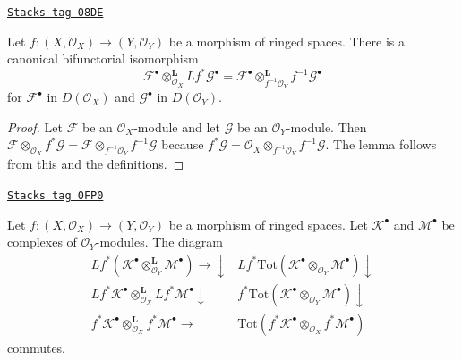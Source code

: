 \begin{lemma}
\label{cohomology-lemma-variant-derived-pullback}
\href{https://stacks.math.columbia.edu/tag/08DE}{\texttt{Stacks tag 08DE}}

Let $f : (X, \mathcal{O}_X) \to (Y, \mathcal{O}_Y)$
be a morphism of ringed spaces. There is a canonical bifunctorial
isomorphism
$$
\mathcal{F}^\bullet
\otimes_{\mathcal{O}_X}^{\mathbf{L}}
Lf^*\mathcal{G}^\bullet
=
\mathcal{F}^\bullet
\otimes_{f^{-1}\mathcal{O}_Y}^{\mathbf{L}}
f^{-1}\mathcal{G}^\bullet
$$
for $\mathcal{F}^\bullet$ in $D(\mathcal{O}_X)$ and
$\mathcal{G}^\bullet$ in $D(\mathcal{O}_Y)$.
\end{lemma}

\begin{proof}
Let $\mathcal{F}$ be an $\mathcal{O}_X$-module and let $\mathcal{G}$
be an $\mathcal{O}_Y$-module. Then
$\mathcal{F} \otimes_{\mathcal{O}_X} f^*\mathcal{G} =
\mathcal{F} \otimes_{f^{-1}\mathcal{O}_Y} f^{-1}\mathcal{G}$
because
$f^*\mathcal{G} =
\mathcal{O}_X \otimes_{f^{-1}\mathcal{O}_Y} f^{-1}\mathcal{G}$.
The lemma follows from this and the definitions.
\end{proof}

\begin{lemma}
\label{cohomology-lemma-tensor-pull-compatibility}
\href{https://stacks.math.columbia.edu/tag/0FP0}{\texttt{Stacks tag 0FP0}}

Let $f : (X, \mathcal{O}_X) \to (Y, \mathcal{O}_Y)$ be a morphism
of ringed spaces. Let $\mathcal{K}^\bullet$ and $\mathcal{M}^\bullet$
be complexes of $\mathcal{O}_Y$-modules. The diagram
$$
\begin{array}{cc}Lf^*(\mathcal{K}^\bullet
\otimes_{\mathcal{O}_Y}^\mathbf{L}
\mathcal{M}^\bullet) \longrightarrow\downarrow & Lf^*\text{Tot}(\mathcal{K}^\bullet
\otimes_{\mathcal{O}_Y}
\mathcal{M}^\bullet) \downarrow \\ Lf^*\mathcal{K}^\bullet \otimes_{\mathcal{O}_X}^\mathbf{L}
Lf^*\mathcal{M}^\bullet \downarrow & f^*\text{Tot}(\mathcal{K}^\bullet
\otimes_{\mathcal{O}_Y}
\mathcal{M}^\bullet) \downarrow \\ f^*\mathcal{K}^\bullet \otimes_{\mathcal{O}_X}^\mathbf{L}
f^*\mathcal{M}^\bullet \longrightarrow & \text{Tot}(f^*\mathcal{K}^\bullet \otimes_{\mathcal{O}_X}
f^*\mathcal{M}^\bullet)\end{array}
$$
commutes.
\end{lemma}


